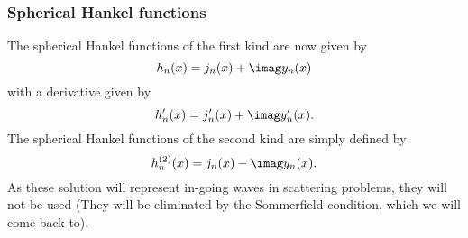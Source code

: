 \subsubsection{Spherical Hankel functions}
The spherical Hankel functions of the first kind are now given by
\begin{equation*}
	h_n(x) = j_n(x) +  \imag y_n(x)
\end{equation*}
with a derivative given by
\begin{equation*}
	h_n'(x) = j_n'(x) +  \imag y_n'(x).
\end{equation*}
The spherical Hankel functions of the second kind are simply defined by
\begin{equation*}
	h_n^{(2)}(x) = j_n(x) -  \imag y_n(x).
\end{equation*}
As these solution will represent in-going waves in scattering problems, they will not be used (They will be eliminated by the Sommerfield condition, which we will come back to).


